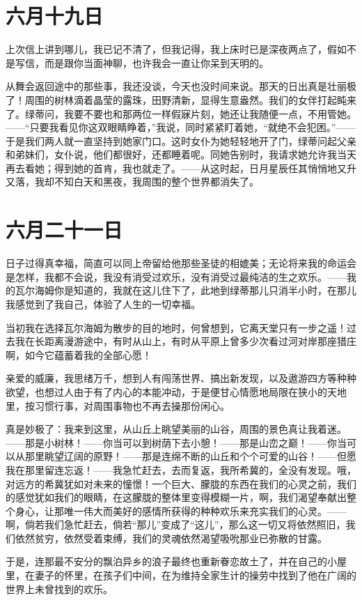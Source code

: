 \documentclass[12pt,oneside]{book}
\begin{document}
\chapter{六月十九日}
上次信上讲到哪儿，我已记不清了，但我记得，我上床时已是深夜两点了，假如不是写信，而是跟你当面神聊，也许我会一直让你呆到天明的。

从舞会返回途中的那些事，我还没谈，今天也没时间来说。那天的日出真是壮丽极了！周围的树林滴着晶莹的露珠，田野清新，显得生意盎然。我们的女伴打起盹来了。绿蒂问，我要不要也和那两位一样假寐片刻，她还让我随便一点，不用管她。——“只要我看见你这双眼睛睁着，”我说，同时紧紧盯着她，“就绝不会犯困。”——于是我们两人就一直坚持到她家门口。这时女仆为她轻轻地开了门，绿蒂问起父亲和弟妹们，女仆说，他们都很好，还都睡着呢。同她告别时，我请求她允许我当天再去看她；得到她的首肯，我也就走了。——从这时起，日月星辰任其悄悄地又升又落，我却不知白天和黑夜，我周围的整个世界都消失了。

\chapter{六月二十一日}
日子过得真幸福，简直可以同上帝留给他那些圣徒的相媲美；无论将来我的命运会是怎样，我都不会说，我没有消受过欢乐，没有消受过最纯洁的生之欢乐。——我的瓦尔海姆你是知道的，我就在这儿住下了，此地到绿蒂那儿只消半小时，在那儿我感觉到了我自己，体验了人生的一切幸福。

当初我在选择瓦尔海姆为散步的目的地时，何曾想到，它离天堂只有一步之遥！过去我在长距离漫游途中，有时从山上，有时从平原上曾多少次看过河对岸那座猎庄啊，如今它蕴蓄着我的全部心愿！

亲爱的威廉，我思绪万千，想到人有闯荡世界、搞出新发现，以及遨游四方等种种欲望，也想过人由于有了内心的本能冲动，于是便甘心情愿地局限在狭小的天地里，按习惯行事，对周围事物也不再去操那份闲心。

真是妙极了：我来到这里，从山丘上眺望美丽的山谷，周围的景色真让我着迷。——那是小树林！——你当可以到树荫下去小憩！——那是山峦之巅！——你当可以从那里眺望辽阔的原野！——那是连绵不断的山丘和个个可爱的山谷！——但愿我在那里留连忘返！——我急忙赶去，去而复返，我所希冀的，全没有发现。哦，对远方的希冀犹如对未来的憧憬！一个巨大、朦胧的东西在我们的心灵之前，我们的感觉犹如我们的眼睛，在这朦胧的整体里变得模糊一片，啊，我们渴望奉献出整个身心，让那唯一伟大而美好的感情所获得的种种欢乐来充实我们的心灵。——啊，倘若我们急忙赶去，倘若“那儿”变成了“这儿”，那么这一切又将依然照旧，我们依然贫穷，依然受着束缚，我们的灵魂依然渴望吸吮那业已弥散的甘露。

于是，连那最不安分的飘泊异乡的浪子最终也重新眷恋故土了，并在自己的小屋里，在妻子的怀里，在孩子们中间，在为维持全家生计的操劳中找到了他在广阔的世界上未曾找到的欢乐。
\end{document}
